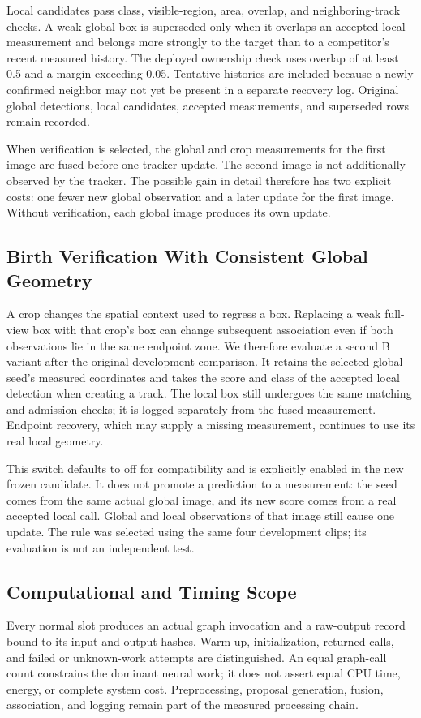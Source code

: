 \documentclass[journal]{IEEEtran}
\begin{document}
Local candidates pass class, visible-region, area, overlap, and neighboring-track checks. A weak global box is superseded only when it overlaps an accepted local measurement and belongs more strongly to the target than to a competitor's recent measured history. The deployed ownership check uses overlap of at least 0.5 and a margin exceeding 0.05. Tentative histories are included because a newly confirmed neighbor may not yet be present in a separate recovery log. Original global detections, local candidates, accepted measurements, and superseded rows remain recorded.

When verification is selected, the global and crop measurements for the first image are fused before one tracker update. The second image is not additionally observed by the tracker. The possible gain in detail therefore has two explicit costs: one fewer new global observation and a later update for the first image. Without verification, each global image produces its own update.

\subsection{Birth Verification With Consistent Global Geometry}
A crop changes the spatial context used to regress a box. Replacing a weak full-view box with that crop's box can change subsequent association even if both observations lie in the same endpoint zone. We therefore evaluate a second B variant after the original development comparison. It retains the selected global seed's measured coordinates and takes the score and class of the accepted local detection when creating a track. The local box still undergoes the same matching and admission checks; it is logged separately from the fused measurement. Endpoint recovery, which may supply a missing measurement, continues to use its real local geometry.

This switch defaults to off for compatibility and is explicitly enabled in the new frozen candidate. It does not promote a prediction to a measurement: the seed comes from the same actual global image, and its new score comes from a real accepted local call. Global and local observations of that image still cause one update. The rule was selected using the same four development clips; its evaluation is not an independent test.

\subsection{Computational and Timing Scope}
Every normal slot produces an actual graph invocation and a raw-output record bound to its input and output hashes. Warm-up, initialization, returned calls, and failed or unknown-work attempts are distinguished. An equal graph-call count constrains the dominant neural work; it does not assert equal CPU time, energy, or complete system cost. Preprocessing, proposal generation, fusion, association, and logging remain part of the measured processing chain.
\end{document}

